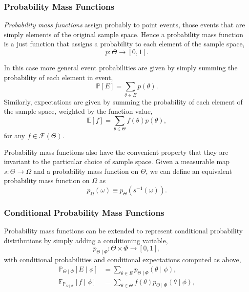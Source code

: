 \documentclass[11pt, oneside]{article}
\newcommand{\PP}{ \mathbb{P} }
\begin{document}
\subsubsection{Probability Mass Functions}

\emph{Probability mass functions} assign probably to point events,
those events that are simply elements of the original sample space.  
Hence a probability mass function is a just function that assigns a 
probability to each element of the sample space,
%
\begin{equation*}
p : \Theta \rightarrow \left[0, 1\right].
\end{equation*}

In this case more general event probabilities are given by simply summing 
the probability of each element in event,
%
\begin{equation*}
\PP \! \left[ E \right]
=
\sum_{\theta \in E} p \! \left( \theta \right).
\end{equation*}
%
Similarly, expectations are given by summing the probability of each 
element of the sample space, weighted by the function value,
%
\begin{equation*}
\mathbb{E} \! \left[ f \right]
=
\sum_{\theta \in \Theta} f \! \left( \theta \right) p \! \left( \theta \right),
\end{equation*}
%
for any $f \in \mathcal{F} \! \left( \Theta \right)$.

Probability mass functions also have the convenient property that
they are invariant to the particular choice of sample space.  Given
a measurable map $s : \Theta \rightarrow \Omega$ and a probability 
mass function on $\Theta$, we can define an equivalent probability 
mass function on $\Omega$ as
%
\begin{equation*}
p_{\Omega} \! \left( \omega \right) 
\equiv 
p_{\Theta} \! \left( s^{-1} \! \left( \omega \right) \right).
\end{equation*}

\subsubsection{Conditional Probability Mass Functions}

Probability mass functions can be extended to represent conditional probability
distributions by simply adding a conditioning variable,
%
\begin{equation*}
p_{\Theta \mid \Phi} : \Theta \times \Phi \rightarrow \left[0, 1\right],
\end{equation*}
%
with conditional probabilities and conditional expectations computed
as above,
%
\begin{align*}
\PP_{\Theta \mid \Phi}  \! \left[ E \mid \phi \right]
&=
\sum_{\theta \in E} p_{\Theta \mid \Phi}  \! \left( \theta \mid \phi \right),
\\
\mathbb{E}_{\PP_{\Theta \mid \Phi} } \! \left[ f \mid \phi \right]
&=
\sum_{\theta \in \Theta} f \! \left( \theta \right) 
p_{\Theta \mid \Phi}  \! \left( \theta \mid \phi \right),
\end{align*}
\end{document}
